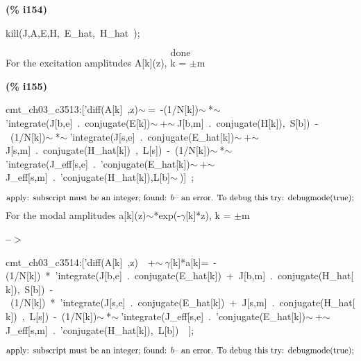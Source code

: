 \documentclass[fleqn]{article}
\begin{document}
\noindent
\begin{minipage}[t]{4.000000em}\color{red}\bfseries
(\% i154)	
\end{minipage}
\begin{minipage}[t]{\textwidth}\color{blue}
kill(J,A,E,H,\ E\_hat,\ H\_hat\ );
\end{minipage}
\[\displaystyle \tag{\% o154} 
\ensuremath{\mathrm{done}}\mbox{}
\]
For the excitation amplitudes A[k](z), k = \ensuremath{\pm}m


\noindent
\begin{minipage}[t]{4.000000em}\color{red}\bfseries
(\% i155)	
\end{minipage}
\begin{minipage}[t]{\textwidth}\color{blue}
cmt\_ch03\_c3513:['diff(A[k]\ ,z)\ensuremath{\sim\ }=\ -(1/N[k])\ensuremath{\sim\ }*\ensuremath{\sim\ }'integrate(J[b,e]\ .\ conjugate(E[k])\ensuremath{\sim\ }+\ensuremath{\sim\ }J[b,m]\ .\ conjugate(H[k]),\ S[b])\ -\ (1/N[k])\ensuremath{\sim\ }*\ensuremath{\sim\ }'integrate(J[s,e]\ .\ conjugate(E\_hat[k])\ensuremath{\sim\ }+\ensuremath{\sim\ }J[s,m]\ .\ conjugate(H\_hat[k])\ ,\ L[s])\ -\ (1/N[k])\ensuremath{\sim\ }*\ensuremath{\sim\ }'integrate(J\_eff[s,e]\ .\ 'conjugate(E\_hat[k])\ensuremath{\sim\ }+\ensuremath{\sim\ }J\_eff[s,m]\ .\ 'conjugate(H\_hat[k]),L[b]\ensuremath{\sim\ })]\ ;
\end{minipage}
\[\displaystyle \mbox{}\\\mbox{%
apply: subscript must be an integer; found: }b
\mbox{%
 -- an error. To debug this try: debugmode(true);}\mbox{}
\]
For the modal amplitudes a[k](z)\ensuremath{\sim }*exp(-\ensuremath{\gamma}[k]*z), k = \ensuremath{\pm}m


\noindent
\begin{minipage}[t]{4.000000em}\color{red}\bfseries
 --\ensuremath{\ensuremath{>}}	
\end{minipage}
\begin{minipage}[t]{\textwidth}\color{blue}
cmt\_ch03\_c3514:['diff(A[k]\ ,z)\ \ +\ensuremath{\sim\ }\ensuremath{\gamma}[k]*a[k]=\ -(1/N[k])\ *\ 'integrate(J[b,e]\ .\ conjugate(E\_hat[k])\ +\ J[b,m]\ .\ conjugate(H\_hat[k]),\ S[b])\ -\ (1/N[k])\ *\ 'integrate(J[s,e]\ .\ conjugate(E\_hat[k])\ +\ J[s,m]\ .\ conjugate(H\_hat[k])\ ,\ L[s])\ -\ (1/N[k])\ensuremath{\sim\ }*\ensuremath{\sim\ }'integrate(J\_eff[s,e]\ .\ 'conjugate(E\_hat[k])\ensuremath{\sim\ }+\ensuremath{\sim\ }J\_eff[s,m]\ .\ 'conjugate(H\_hat[k]),\ L[b])\ \ ];
\end{minipage}
\[\displaystyle \mbox{}\\\mbox{%
apply: subscript must be an integer; found: }b
\mbox{%
 -- an error. To debug this try: debugmode(true);}\mbox{}
\]
\end{document}
